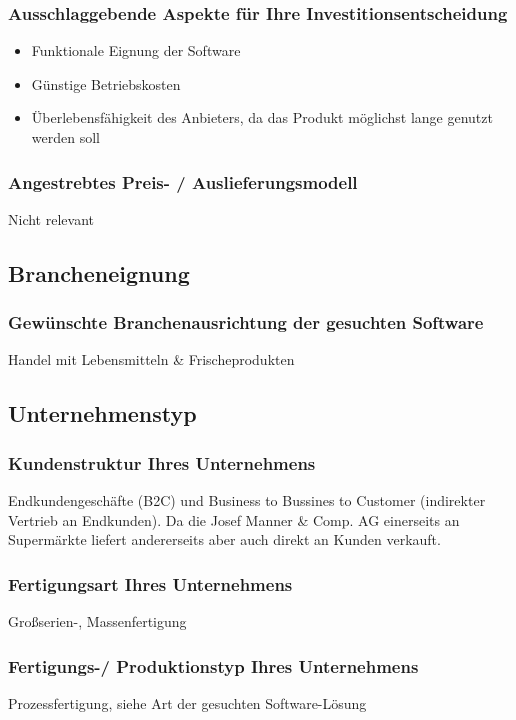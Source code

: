 \subsubsection{Ausschlaggebende Aspekte für Ihre Investitionsentscheidung}
\begin{itemize}
	\item Funktionale Eignung der Software
	\item Günstige Betriebskosten
	\item Überlebensfähigkeit des Anbieters, da das Produkt möglichst lange genutzt werden soll
\end{itemize}
\subsubsection{Angestrebtes Preis- / Auslieferungsmodell}
Nicht relevant

\subsection{Brancheneignung}
\subsubsection{Gewünschte Branchenausrichtung der gesuchten Software}
Handel mit Lebensmitteln \& Frischeprodukten

\subsection{Unternehmenstyp}
\subsubsection{Kundenstruktur Ihres Unternehmens}
Endkundengeschäfte (B2C) und Business to Bussines to Customer (indirekter Vertrieb an Endkunden). Da die Josef Manner \& Comp. AG einerseits an Supermärkte liefert andererseits aber auch direkt an Kunden verkauft.
\subsubsection{Fertigungsart Ihres Unternehmens}
Großserien-, Massenfertigung

\subsubsection{Fertigungs-/ Produktionstyp Ihres Unternehmens}
Prozessfertigung, siehe Art der gesuchten Software-Lösung

